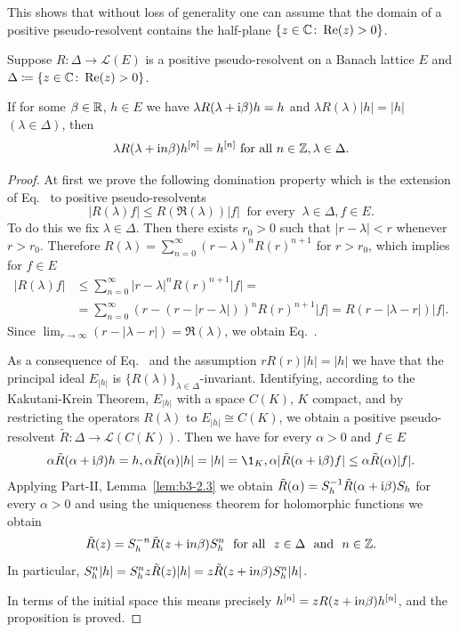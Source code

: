 This shows that without loss of generality one can assume that the domain of a positive pseudo-resolvent contains the half-plane $\{z \in \mathbb{C}  \colon \mathop{}\!\mathrm{Re}(z) > 0\}$.
\begin{proposition}\label{prop:c3-2.7}
	Suppose $R \colon \Delta \to \mathcal{L}(E)$ is a positive pseudo-resolvent on a Banach lattice $E$ and $\Delta \coloneq \{z \in \mathbb{C}  \colon \mathop{}\!\mathrm{Re}(z) > 0\}$.
	
	If for some $\beta \in \mathbb{R} $, $h \in E$ we have
	$\lambda R(\lambda+\mathrm{i}\beta)h = h$ and $\lambda R(\lambda)|h| = |h|$ $(\lambda \in \Delta)$, then
	\[
    \lambda R(\lambda+\mathrm{i} n\beta)h^{[n]} = h^{[n]} \text{ for all } n \in \mathbb{Z}, \lambda \in \Delta .
    \]
\end{proposition}
\begin{proof}
At first we prove the following domination property which is the extension of Eq.~ to positive pseudo-resolvents
\begin{equation}\label{eq:c3-2.13}
	|R(\lambda)f| \leq R(\Re(\lambda)) |f| \ \text{ for every } \ \lambda \in \Delta , f \in E .
\end{equation}
To do this we fix $\lambda \in \Delta$.
Then there exists $r_{0} > 0$ such that $|r-\lambda| < r$ whenever $r > r_{0}$.
Therefore $R(\lambda) = \sum_{n=0}^{\infty}(r-\lambda)^{n}R(r)^{n+1}$ for $r > r_{0}$, which implies for $f \in E$
\begin{align*}
	|R(\lambda)f| &\leq \sum_{n=0}^{\infty}|r-\lambda|^{n}R(r)^{n+1}|f| = \\
	& =\sum_{n=0}^{\infty}(r - (r-|r-\lambda|))^{n}R(r)^{n+1}|f| = R(r - |\lambda-r|) |f| .
\end{align*}
Since $\lim_{r \to \infty} (r - |\lambda-r|) = \Re(\lambda)$, we obtain Eq.~.

As a consequence of Eq.~ and the assumption $rR(r) |h| = |h|$ we have that the principal ideal $E_{|h|}$ is $\{R(\lambda)\}_{\lambda \in \Delta}$-invariant.
Identifying, according to the Kakutani-Krein Theorem, $E_{|h|}$ with a space $C(K)$, $K$ compact, and by restricting the operators $R(\lambda)$ to $E_{|h|} \cong C(K)$, we obtain a positive pseudo-resolvent $\tilde{R} \colon \Delta \to \mathcal{L}(C(K))$.
Then we have for every $\alpha > 0$ and $f \in E$
\[
\alpha\tilde{R}(\alpha+\im\beta)h = h, \alpha\tilde{R}(\alpha) |h| = |h| = \1_{K}, \alpha|\tilde{R}(\alpha+\im\beta)f| \leq \alpha\tilde{R}(\alpha) |f| .
\]
Applying Part-II, Lemma~\ref{lem:b3-2.3} we obtain $\tilde{R}(\alpha) = S_{h}^{-1}\tilde{R}(\alpha + \mathrm{i}\beta)S_{h}$ for every $\alpha > 0$ and using the uniqueness theorem for holomorphic functions we obtain
\begin{equation}\label{eq:c3-2.14}
\tilde{R}(z) = S_{h}^{-n}\tilde{R}(z + \mathrm{i} n\beta)S_{h}^{n} \ \text{ for all } \ z \in \Delta \ \text{ and } \ n \in \mathbb{Z} .
\end{equation}
In particular, $S_{h}^{n}|h| = S_{h}^{n}z\tilde{R}(z) |h| = z\tilde{R}(z+\mathrm{i} n\beta)S_{h}^{n}|h|$.

In terms of the initial space this means precisely $h^{[n]} = zR(z+\mathrm{i} n\beta)h^{[n]}$, and the proposition is proved.
\end{proof}
